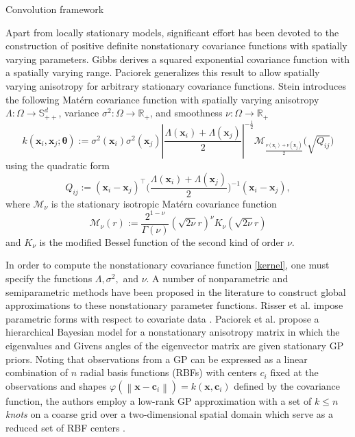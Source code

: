 \documentclass{article}
\newcommand{\norm}[1]{\left\lVert#1\right\rVert}
\newcommand{\abs}[1]{\left|#1\right|}
\newcommand{\R}{\mathbb{R}}
\numberwithin{equation}{section}
\begin{document}
Convolution framework

Apart from locally stationary models, significant effort has been devoted to the construction of positive definite nonstationary covariance functions with spatially varying parameters. Gibbs \cite{gibbs1997bayesian} derives a squared exponential covariance function with a spatially varying range. Paciorek \cite{paciorek2003nonstationary} generalizes this result to allow spatially varying anisotropy for arbitrary stationary covariance functions. Stein \cite{stein2005nonstationary} introduces the following Mat\'ern covariance function with spatially varying anisotropy $\Lambda : \Omega \to \mathbb{S}^d_{++}$, variance $\sigma^2 : \Omega \to \R_+$, and smoothness $\nu : \Omega \to \R_+$
\begin{equation}
  k(\mathbf{x}_i, \mathbf{x}_j; \bm{\theta}) := \sigma^2(\mathbf{x}_i) \sigma^2(\mathbf{x}_j) \abs{\frac{\Lambda(\mathbf{x}_i) + \Lambda(\mathbf{x}_j)}{2}}^{-\frac{1}{2}}
  \mathcal{M}_{\frac{\nu(\mathbf{x}_i) + \nu(\mathbf{x}_j)}{2}} \bigg( \sqrt{Q_{ij}} \bigg)
  \label{kernel}
\end{equation}
using the quadratic form
\begin{equation*}
  Q_{ij} := (\mathbf{x}_i - \mathbf{x}_j)^\top \Big(\frac{\Lambda(\mathbf{x}_i) + \Lambda(\mathbf{x}_j)}{2}\Big)^{-1} (\mathbf{x}_i - \mathbf{x}_j),
\end{equation*}
where $\mathcal{M}_\nu$ is the stationary isotropic Mat\'ern covariance function
$$ \mathcal{M}_\nu(r) := \frac{2^{1-\nu}}{\Gamma(\nu)} (\sqrt{2\nu} r)^\nu K_\nu(\sqrt{2\nu} r) $$
and $K_\nu$ is the modified Bessel function of the second kind of order $\nu$.

In order to compute the nonstationary covariance function \ref{kernel}, one must specify the functions $\Lambda, \sigma^2,$ and $\nu$. A number of nonparametric and semiparametric methods have been proposed in the literature to construct global approximations to these nonstationary parameter functions. Risser et al. impose parametric forms with respect to covariate data \cite{risser2015regression}. Paciorek et al. \cite{paciorek2004nonstationary} propose a hierarchical Bayesian model for a nonstationary anisotropy matrix in which the eigenvalues and Givens angles of the eigenvector matrix are given stationary GP priors.
Noting that observations from a GP can be expressed as a linear combination of $n$ radial basis functions (RBFs) with centers $c_i$ fixed at the observations and shapes $\varphi(\norm{\mathbf{x} - \mathbf{c}_i}) = k(\mathbf{x}, \mathbf{c}_i)$ defined by the covariance function, the authors employ a low-rank GP approximation with a set of $k \leq n$ \textit{knots} on a coarse grid over a two-dimensional spatial domain which serve as a reduced set of RBF centers \cite{kammann2003geoadditive, paciorek2006spatial}.
\end{document}
